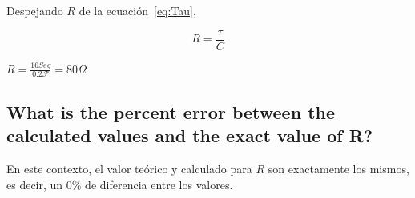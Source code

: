 \documentclass[twocolumn, 12pt]{article}
\begin{document}
Despejando $R$ de la ecuación~\eqref{eq:Tau},

{\large
        \begin{equation}
            R = \frac{\tau}{C}
        \end{equation}
    }

$R = \frac{16 Seg}{0.2\mathcal{F}} = 80 \Omega$

\subsection{What is the percent error between the calculated values and the exact value of R?}

En este contexto, el valor teórico y calculado para $R$ son
exactamente los mismos, es decir, un 0\% de diferencia
entre los valores.

\printbibliography
\end{document}
